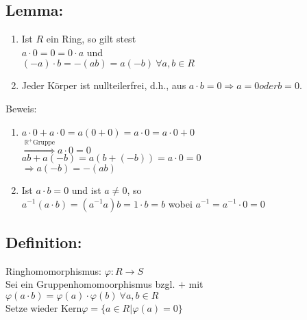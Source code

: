 \subsection{Lemma:}
\begin{enumerate}[label={(\alph*)}]
	\item Ist $R$ ein Ring, so gilt stest\\
		$a \cdot 0 = 0 = 0 \cdot a$ und \\
		$(-a) \cdot b = -(ab) = a(-b) \ \forall a,b \in R$
	\item Jeder Körper ist nullteilerfrei, d.h., aus $a \cdot b =0 \Rightarrow a=0 oder b=0.$
  \end{enumerate} 
Beweis:
\begin{enumerate}[label={(\alph*)}]
	\item $a \cdot 0 + a \cdot 0 = a(0+0) = a \cdot 0 = a \cdot 0 + 0$\\ 
		$\mathop{\Rightarrow}\limits^{\mathbb{R}^{+}\text{Gruppe}} a \cdot 0 = 0$ \\
		$ab + a(-b) = a(b+(-b))=a \cdot 0 = 0$\\
		$\Rightarrow a(-b) = -(ab)$
	\item Ist $a \cdot b = 0$ und ist $a \neq 0$, so\\
		$a^{-1}(a \cdot b) = (a^{-1}a)b=1 \cdot b = b$ wobei $a^{-1} = a^{-1} \cdot 0 = 0$
\end{enumerate}
%
%
%
\subsection{Definition:}
 Ringhomomorphismus: $\varphi:R\rightarrow S$\\
Sei ein Gruppenhomomoorphismus bzgl. $+$ mit $\varphi(a \cdot b) = \varphi (a) \cdot \varphi(b) \ \forall a,b \in R$\\
Setze wieder Kern$\varphi = \{a \in R| \varphi(a)=0\}$
%
%
%
